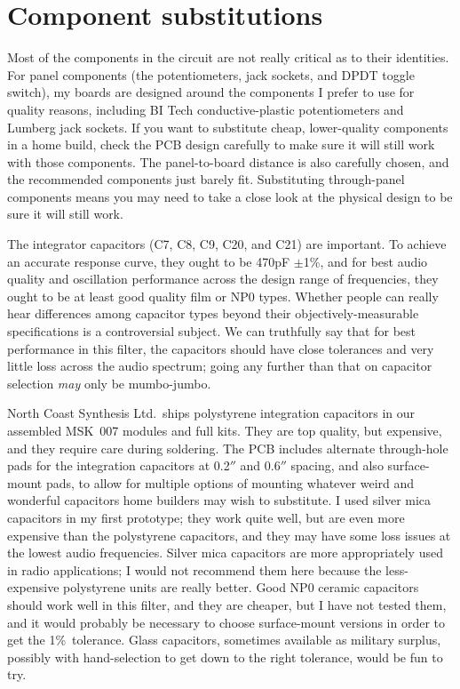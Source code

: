 \section{Component substitutions}

Most of the components in the circuit are not really critical as to their
identities.  For panel components (the potentiometers, jack sockets, and
DPDT toggle switch), my boards are designed around the components I prefer
to use for quality reasons, including BI Tech conductive-plastic
potentiometers and Lumberg jack sockets.  If you want to substitute cheap,
lower-quality components in a home build, check the PCB design carefully to
make sure it will still work with those components.  The panel-to-board
distance is also carefully chosen, and the recommended components just
barely fit.  Substituting through-panel components means you may need to
take a close look at the physical design to be sure it will still work.

The integrator capacitors (C7, C8, C9, C20, and C21) are
important.\label{pag:integrator-sub}  To achieve an accurate response curve,
they ought to be 470pF $\pm$1\%, and for best audio quality and oscillation
performance across the design range of frequencies, they ought to be at
least good quality film or NP0 types.  Whether people can really hear
differences among capacitor types beyond their objectively-measurable
specifications is a controversial subject.  We can truthfully say that for
best performance in this filter, the capacitors should have close tolerances
and very little loss across the audio spectrum; going any further than that
on capacitor selection \emph{may} only be mumbo-jumbo.
 
North Coast Synthesis Ltd.\ ships polystyrene integration capacitors in our
assembled MSK~007 modules and full kits.  They are top quality, but
expensive, and they require care during soldering.  The PCB includes
alternate through-hole pads for the integration capacitors at 0.2$''$ and
0.6$''$ spacing, and also surface-mount pads, to allow for multiple options
of mounting whatever weird and wonderful capacitors home builders may wish
to substitute.  I used silver mica capacitors in my first prototype; they
work quite well, but are even more expensive than the polystyrene
capacitors, and they may have some loss issues at the lowest audio
frequencies.  Silver mica capacitors are more appropriately used in radio
applications; I would not recommend them here because the less-expensive
polystyrene units are really better.  Good NP0 ceramic capacitors should
work well in this filter, and they are cheaper, but I have not tested them,
and it would probably be necessary to choose surface-mount versions in order
to get the 1\%\ tolerance.  Glass capacitors, sometimes available as
military surplus, possibly with hand-selection to get down to the right
tolerance, would be fun to try.

